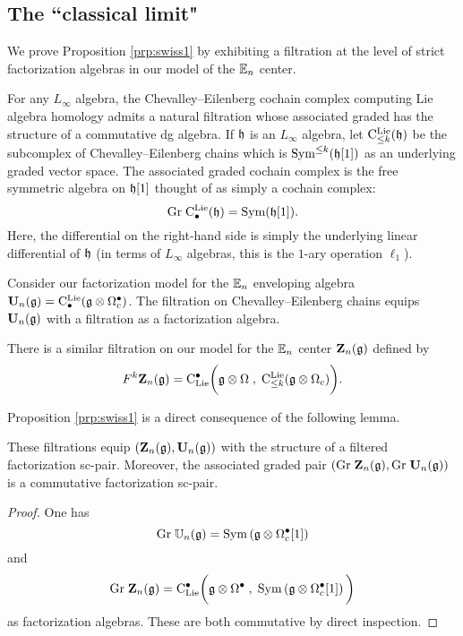 \documentclass[11pt]{amsart}
\numberwithin{equation}{section}
\begin{document}

\subsection{The ``classical limit"}

We prove Proposition \ref{prp:swiss1} by exhibiting a filtration at the level of strict factorization algebras in our model of the $\mathbb E_n$ center. 

For any $L_\infty$ algebra, the Chevalley--Eilenberg cochain complex computing Lie algebra homology admits a natural filtration whose associated graded has the structure of a commutative dg algebra.
If $\mathfrak h$ is an $L_\infty$ algebra, let ${\rm C}^{\rm Lie}_{\leq k} (\mathfrak h)$ be the subcomplex of Chevalley--Eilenberg chains which is ${\rm Sym}^{\leq k} (\mathfrak h[1])$ as an underlying graded vector space. 
The associated graded cochain complex is the free symmetric algebra on $\mathfrak h[1]$ thought of as simply a cochain complex:
\[
{\rm Gr} \; {\rm C}^{\rm Lie}_\bullet (\mathfrak h) = {\rm Sym} (\mathfrak h [1])  .
\]
Here, the differential on the right-hand side is simply the underlying linear differential of $\mathfrak h$ (in terms of $L_\infty$ algebras, this is the $1$-ary operation $\ell_1$). 

Consider our factorization model for the $\mathbb E_n$ enveloping algebra $\mathbf U_n(\mathfrak g) = {\rm C}^{\rm Lie}_\bullet (\mathfrak g \otimes \Omega^\bullet_c)$. 
The filtration on Chevalley--Eilenberg chains equips $\mathbf U_n(\mathfrak g)$ with a filtration as a factorization algebra. 

There is a similar filtration on our model for the $\mathbb E_n$ center $\mathbf Z_n(\mathfrak g)$ defined by
\[
F^k \mathbf Z_n(\mathfrak g) = {\rm C}_{\rm Lie}^\bullet \bigg(\mathfrak g \otimes \Omega \; , \; {\rm C}^{\rm Lie}_{\leq k} (\mathfrak g \otimes \Omega_c) \bigg) .
\]

Proposition \ref{prp:swiss1} is a direct consequence of the following lemma.

\begin{lmm}
These filtrations equip $(\mathbf Z_n (\mathfrak g), \mathbf U_n(\mathfrak g))$ with the structure of a filtered factorization sc-pair.
Moreover, the associated graded pair $({\rm Gr} \; \mathbf Z_n (\mathfrak g), {\rm Gr} \; \mathbf U_n(\mathfrak g))$ is a commutative factorization sc-pair. 
\end{lmm}
\begin{proof}
One has
\[
{\rm Gr} \; \mathbb U_n (\mathfrak g) = {\rm Sym} \left(\mathfrak g \otimes \Omega^\bullet_c [1] \right)
\]
and
\[
{\rm Gr} \; \mathbf Z_n (\mathfrak g) = {\rm C}_{{\rm Lie}}^\bullet\bigg(\mathfrak g \otimes \Omega^\bullet \; , \; {\rm Sym} \left(\mathfrak g \otimes \Omega^\bullet_c [1]\right) \bigg) 
\]
as factorization algebras. 
These are both commutative by direct inspection. 
\end{proof}
\end{document}
